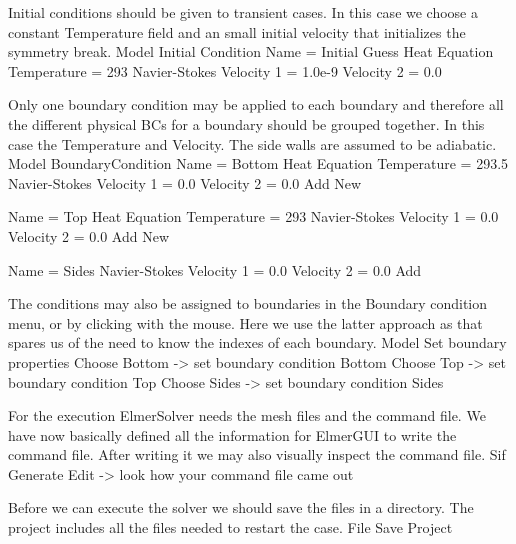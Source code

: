 Initial conditions should be given to transient cases. In this case we choose a constant Temperature field and an small initial velocity that initializes the symmetry break. 
\ttbegin
Model
  Initial Condition 
    Name = Initial Guess
    Heat Equation
      Temperature = 293
    Navier-Stokes
      Velocity 1 = 1.0e-9
      Velocity 2 = 0.0
\ttend

Only one boundary condition may be applied to each boundary and therefore all the 
different physical BCs for a boundary should be grouped together. In this case the
Temperature and Velocity. The side walls are assumed to be adiabatic.
\ttbegin
Model
  BoundaryCondition
    Name = Bottom
    Heat Equation
      Temperature = 293.5
    Navier-Stokes 
      Velocity 1 = 0.0
      Velocity 2 = 0.0
    Add
    New

    Name = Top
    Heat Equation
      Temperature = 293
    Navier-Stokes 
      Velocity 1 = 0.0
      Velocity 2 = 0.0
    Add 
    New
 
    Name = Sides
    Navier-Stokes 
      Velocity 1 = 0.0
      Velocity 2 = 0.0
    Add
\ttend   

The conditions may also be assigned to boundaries in the Boundary condition menu, or 
by clicking with the mouse. Here we use the latter approach as that spares us of the 
need to know the indexes of each boundary.
\ttbegin
Model
  Set boundary properties
    Choose Bottom -> set boundary condition Bottom
    Choose Top -> set boundary condition Top
    Choose Sides -> set boundary condition Sides
\ttend


For the execution 
ElmerSolver needs the mesh files and the command file. We have now basically defined
all the information for ElmerGUI to write the command file. After writing it we may also visually 
inspect the command file.
\ttbegin
Sif 
  Generate
  Edit -> look how your command file came out  
\ttend

Before we can execute the solver we should save the files in a directory. The project includes
all the files needed to restart the case.
\ttbegin
File 
  Save Project
\ttend

